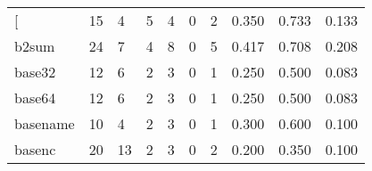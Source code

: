 \begin{longtable}{lp{1.3cm}p{1.3cm}p{1.3cm}p{1.3cm}p{1.3cm}p{1.3cm}p{1.3cm}p{1.3cm}p{1.3cm}}
\bottomrule
\endlastfoot
{[}         &                     15 &                                             4 &                                            5 &                                           4 &                                            0 &                                          2 &                                0.350 &                                  0.733 &                                0.133 \\
b2sum     &                     24 &                                             7 &                                            4 &                                           8 &                                            0 &                                          5 &                                0.417 &                                  0.708 &                                0.208 \\
base32    &                     12 &                                             6 &                                            2 &                                           3 &                                            0 &                                          1 &                                0.250 &                                  0.500 &                                0.083 \\
base64    &                     12 &                                             6 &                                            2 &                                           3 &                                            0 &                                          1 &                                0.250 &                                  0.500 &                                0.083 \\
basename  &                     10 &                                             4 &                                            2 &                                           3 &                                            0 &                                          1 &                                0.300 &                                  0.600 &                                0.100 \\
basenc    &                     20 &                                            13 &                                            2 &                                           3 &                                            0 &                                          2 &                                0.200 &                                  0.350 &                                0.100 \\

\end{longtable}
